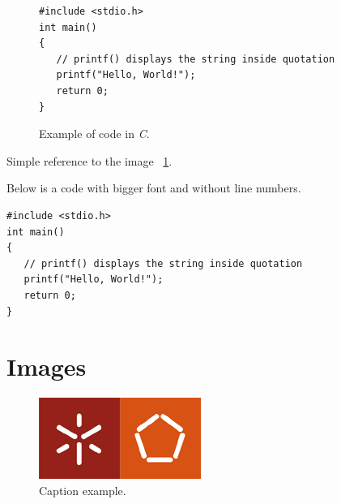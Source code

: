 \documentclass[12pt,a4paper]{article}
\begin{document}
\begin{figure}[H]
\begin{verbatim}
#include <stdio.h>
int main()
{
   // printf() displays the string inside quotation
   printf("Hello, World!");
   return 0;
}
\end{verbatim}
\caption{Example of code in \emph{C}.}
\label{fig:c}
\end{figure}

\bigbreak
Simple reference to the image ~\ref{fig:c}. 

Below is a code with bigger font and without line numbers.

\bigbreak
\begin{verbatim}
#include <stdio.h>
int main()
{
   // printf() displays the string inside quotation
   printf("Hello, World!");
   return 0;
}
\end{verbatim}



\newpage
\section{Images}

\begin{figure}[H]
  \centering
  \includegraphics[scale=4]{images/logo_um.jpg}
  \caption{Caption example.}
\end{figure}
\end{document}
